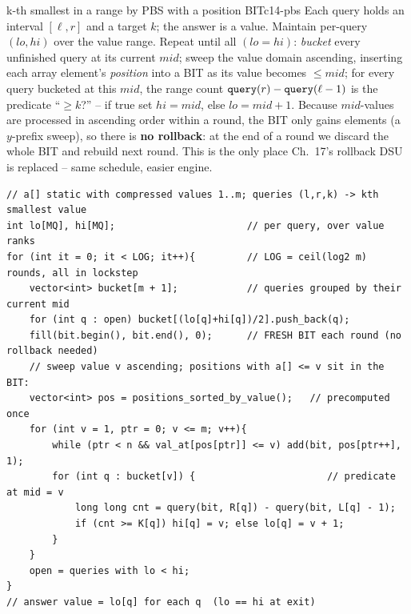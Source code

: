 \begin{proposition}{k-th smallest in a range by PBS with a position BIT}{c14-pbs}
Each query holds an interval \([\ell,r]\) and a target \(k\); the answer is a
value.  Maintain per-query \((lo,hi)\) over the value range.  Repeat until all
\((lo{=}hi)\): \emph{bucket} every unfinished query at its current \(mid\);
sweep the value domain ascending, inserting each array element's \emph{position}
into a BIT as its value becomes \(\le mid\); for every query bucketed at this
\(mid\), the range count \(\texttt{query}(r)-\texttt{query}(\ell-1)\) is the
predicate ``\(\ge k\)?'' -- if true set \(hi=mid\), else \(lo=mid+1\).  Because
\(mid\)-values are processed in ascending order within a round, the BIT only
gains elements (a \(y\)-prefix sweep), so there is \textbf{no rollback}: at the
end of a round we discard the whole BIT and rebuild next round.  This is the
only place Ch.~17's rollback DSU is replaced -- same schedule, easier engine.
\end{proposition}

\begin{lstlisting}[caption={PBS skeleton: lockstep binary search whose predicate is one BIT sweep}, label={lst:c14-pbs}]
// a[] static with compressed values 1..m; queries (l,r,k) -> kth smallest value
int lo[MQ], hi[MQ];                       // per query, over value ranks
for (int it = 0; it < LOG; it++){         // LOG = ceil(log2 m) rounds, all in lockstep
    vector<int> bucket[m + 1];            // queries grouped by their current mid
    for (int q : open) bucket[(lo[q]+hi[q])/2].push_back(q);
    fill(bit.begin(), bit.end(), 0);      // FRESH BIT each round (no rollback needed)
    // sweep value v ascending; positions with a[] <= v sit in the BIT:
    vector<int> pos = positions_sorted_by_value();   // precomputed once
    for (int v = 1, ptr = 0; v <= m; v++){
        while (ptr < n && val_at[pos[ptr]] <= v) add(bit, pos[ptr++], 1);
        for (int q : bucket[v]) {                       // predicate at mid = v
            long long cnt = query(bit, R[q]) - query(bit, L[q] - 1);
            if (cnt >= K[q]) hi[q] = v; else lo[q] = v + 1;
        }
    }
    open = queries with lo < hi;
}
// answer value = lo[q] for each q  (lo == hi at exit)
\end{lstlisting}

